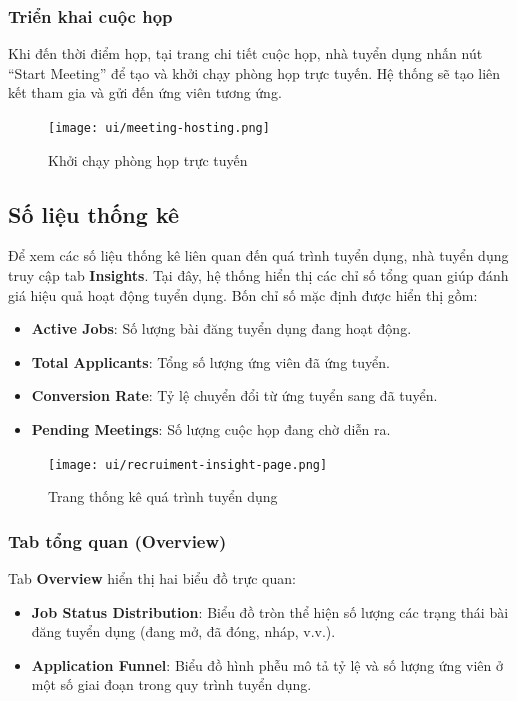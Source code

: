 \subsubsection{Triển khai cuộc họp}

Khi đến thời điểm họp, tại trang chi tiết cuộc họp, nhà tuyển dụng nhấn nút ``Start Meeting'' để tạo và khởi chạy phòng họp trực tuyến.  
Hệ thống sẽ tạo liên kết tham gia và gửi đến ứng viên tương ứng.

\begin{figure}[H]
  \centering
  \texttt{[image: ui/meeting-hosting.png]}
  \caption{Khởi chạy phòng họp trực tuyến}
  \label{fig:meeting-hosting}
\end{figure}

\subsection{Số liệu thống kê}

Để xem các số liệu thống kê liên quan đến quá trình tuyển dụng, nhà tuyển dụng truy cập tab \textbf{Insights}.  
Tại đây, hệ thống hiển thị các chỉ số tổng quan giúp đánh giá hiệu quả hoạt động tuyển dụng.
Bốn chỉ số mặc định được hiển thị gồm:
\begin{itemize}
  \item \textbf{Active Jobs}: Số lượng bài đăng tuyển dụng đang hoạt động.
  \item \textbf{Total Applicants}: Tổng số lượng ứng viên đã ứng tuyển.
  \item \textbf{Conversion Rate}: Tỷ lệ chuyển đổi từ ứng tuyển sang đã tuyển.
  \item \textbf{Pending Meetings}: Số lượng cuộc họp đang chờ diễn ra.
\end{itemize}

\begin{figure}[H]
  \centering
  \texttt{[image: ui/recruiment-insight-page.png]}
  \caption{Trang thống kê quá trình tuyển dụng}
  \label{fig:recruiment-insight-page}
\end{figure}

\subsubsection{Tab tổng quan (Overview)}

Tab \textbf{Overview} hiển thị hai biểu đồ trực quan:
\begin{itemize}
  \item \textbf{Job Status Distribution}: Biểu đồ tròn thể hiện số lượng các trạng thái bài đăng tuyển dụng (đang mở, đã đóng, nháp, v.v.).
  \item \textbf{Application Funnel}: Biểu đồ hình phễu mô tả tỷ lệ và số lượng ứng viên ở một số giai đoạn trong quy trình tuyển dụng.
\end{itemize}

